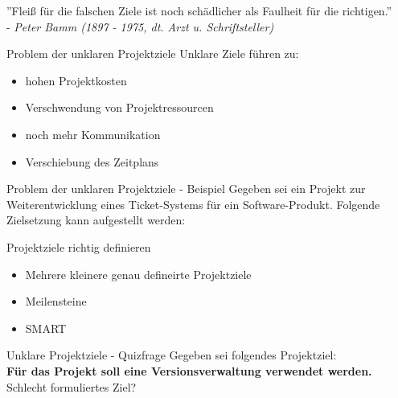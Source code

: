 \documentclass[12pt]{beamer}
\begin{document}
	\thispagestyle{empty}
	\begin{frame}
		''Fleiß für die falschen Ziele ist noch schädlicher als Faulheit für die richtigen.'' \\
		- \textit{Peter Bamm (1897 - 1975, dt. Arzt u. Schriftsteller)}
	\end{frame}

	
	\begin{frame}{Problem der unklaren Projektziele}
		Unklare Ziele führen zu:
		\begin{itemize}
			\item{hohen Projektkosten}
			\item{Verschwendung von Projektressourcen}
			\item{noch mehr Kommunikation}
			\item{Verschiebung des Zeitplans}
		\end{itemize}

	\end{frame}

	\begin{frame}{Problem der unklaren Projektziele - Beispiel}
		Gegeben sei ein Projekt zur Weiterentwicklung eines Ticket-Systems für ein Software-Produkt. Folgende Zielsetzung kann aufgestellt werden: \\

		
	\end{frame}

	\begin{frame}{Projektziele richtig definieren}
		\begin{itemize}
			\item{Mehrere kleinere genau defineirte Projektziele}
			\item{Meilensteine}
			\item{SMART}
		\end{itemize}
	\end{frame}

	\begin{frame}{Unklare Projektziele - Quizfrage}
		Gegeben sei folgendes Projektziel:\\
		\textbf{Für das Projekt soll eine Versionsverwaltung verwendet werden.} \\
		Schlecht formuliertes Ziel? \\
	\end{frame}
\end{document}
